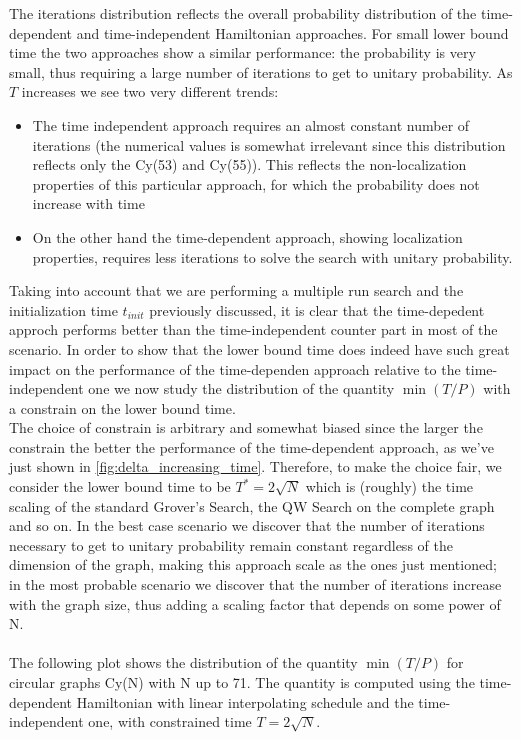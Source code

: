         The iterations distribution reflects the overall probability distribution of the time-dependent and time-independent Hamiltonian approaches. For small lower bound time the two approaches show a similar performance: the probability is very small, thus requiring a large number of iterations to get to unitary probability. As $T$ increases we see two very different trends:
        \begin{itemize}
            \item The time independent approach requires an almost constant number of iterations (the numerical values is somewhat irrelevant since this distribution reflects only the Cy(53) and Cy(55)). This reflects the non-localization properties of this particular approach, for which the probability does not increase with time
            \item On the other hand the time-dependent approach, showing localization properties, requires less iterations to solve the search with unitary probability.
        \end{itemize}
        Taking into account that we are performing a multiple run search and the initialization time $t_{init}$ previously discussed, it is clear that the time-depedent approch performs better than the time-independent counter part in most of the scenario.
        \clearpage
        In order to show that the lower bound time does indeed have such great impact on the performance of the time-dependen approach relative to the time-independent one we now study the distribution of the quantity $\min(T/P)$ with a constrain on the lower bound time. \\ The choice of constrain is arbitrary and somewhat biased since the larger the constrain the better the performance of the time-dependent approach, as we've just shown in \cref{fig:delta_increasing_time}. Therefore, to make the choice fair, we consider the lower bound time to be $T^* = 2\sqrt{N}$ which is (roughly) the time scaling of the standard Grover's Search, the QW Search on the complete graph and so on. In the best case scenario we discover that the number of iterations necessary to get to unitary probability remain constant regardless of the dimension of the graph, making this approach scale as the ones just mentioned; in the most probable scenario we discover that the number of iterations increase with the graph size, thus adding a scaling factor that depends on some power of N. \\ \\ The following plot shows the distribution of the quantity $\min(T/P)$ for circular graphs Cy(N) with N up to 71. The quantity is computed using the time-dependent Hamiltonian with linear interpolating schedule and the time-independent one, with constrained time $T=2 \sqrt{N}$.

